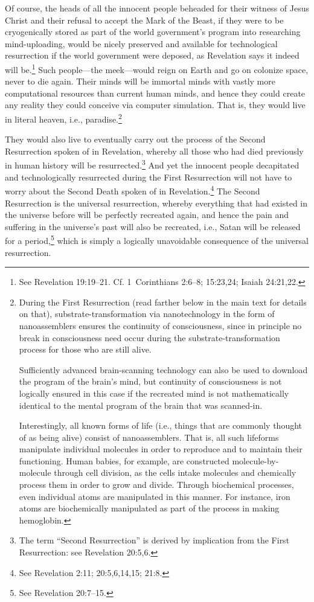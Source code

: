 \documentclass[letterpaper,12pt]{article}
\begin{document}
Of course, the heads of all the innocent people beheaded for their witness of Jesus Christ and their refusal to accept the Mark of the Beast, if they were to be cryogenically stored as part of the world government's program into researching mind-uploading, would be nicely preserved and available for technological resurrection if the world government were deposed, as Revelation says it indeed will be.\footnote{See Revelation 19:19--21. Cf. 1~Corinthians 2:6--8; 15:23,24; Isaiah 24:21,22.} Such people---the meek---would reign on Earth and go on colonize space, never to die again. Their minds will be immortal minds with vastly more computational resources than current human minds, and hence they could create any reality they could conceive via computer simulation. That is, they would live in literal heaven, i.e., paradise.\footnote{During the First Resurrection (read farther below in the main text for details on that), substrate-transformation via nanotechnology in the form of nanoassemblers ensures the continuity of consciousness, since in principle no break in consciousness need occur during the substrate-transformation process for those who are still alive.\par
    Sufficiently advanced brain-scanning technology can also be used to download the program of the brain's mind, but continuity of consciousness is not logically ensured in this case if the recreated mind is not mathematically identical to the mental program of the brain that was scanned-in.\par
    Interestingly, all known forms of life (i.e., things that are commonly thought of as being alive) consist of nanoassemblers. That is, all such lifeforms manipulate individual molecules in order to reproduce and to maintain their functioning. Human babies, for example, are constructed molecule-by-molecule through cell division, as the cells intake molecules and chemically process them in order to grow and divide. Through biochemical processes, even individual atoms are manipulated in this manner. For instance, iron atoms are biochemically manipulated as part of the process in making hemoglobin.}

They would also live to eventually carry out the process of the Second Resurrection spoken of in Revelation, whereby all those who had died previously in human history will be resurrected.\footnote{\label{foot:FirstAndSecondResurrections}The term ``Second Resurrection'' is derived by implication from the First Resurrection: see Revelation 20:5,6.} And yet the innocent people decapitated and technologically resurrected during the First Resurrection will not have to worry about the Second Death spoken of in Revelation.\footnote{See Revelation 2:11; 20:5,6,14,15; 21:8.} The Second Resurrection is the universal resurrection, whereby everything that had existed in the universe before will be perfectly recreated again, and hence the pain and suffering in the universe's past will also be recreated, i.e., Satan will be released for a period,\footnote{See Revelation 20:7--15.} which is simply a logically unavoidable consequence of the universal resurrection.
\end{document}
